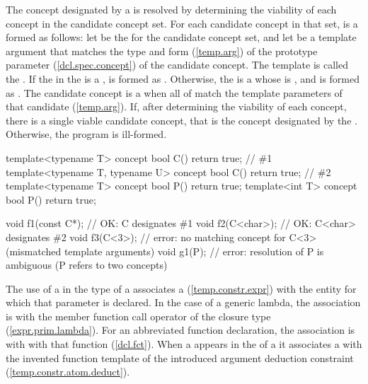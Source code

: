 \pnum
The concept designated by a 
is resolved by determining the viability of each concept in the
candidate concept set.
% 
For each candidate concept in that set,  is a 
 formed as follows:
% 
let  be the 
for the candidate concept set, and let  be a template 
argument that matches
the type and form (\ref{temp.arg}) of the prototype 
parameter (\ref{dcl.spec.concept})
of the candidate concept. 
% 
The template  is called the 
.
% 
If the  in
the  is
a ,  is
formed as .
% 
Otherwise, the  is
a  whose
 is
, and
 is formed as
.
% 
The candidate concept is a  when all
 of  
match the template parameters of that candidate 
(\ref{temp.arg}).
% 
If, after determining the viability of each concept, there is a
single viable candidate concept, that is the concept designated by the
.
% 
Otherwise, the program is ill-formed.
% 
\enterexample
\begin{codeblock}
template<typename T> concept bool C() { return true; }             // \#1
template<typename T, typename U> concept bool C() { return true; } // \#2
template<typename T> concept bool P() { return true; }
template<int T> concept bool P() { return true; }

void f1(const C*); // OK: C designates \#1
void f2(C<char>);  // OK: C<char> designates \#2
void f3(C<3>);     // error: no matching concept for C<3> (mismatched template arguments)
void g1(P);        // error: resolution of P is ambiguous (P refers to two concepts)
\end{codeblock}
\exitexample


\pnum
The use of a 
in the type of a 
associates a  
(\ref{temp.constr.expr}) with the 
entity for which that parameter is declared. 
% 
In the case of a generic lambda, the association is with
the member function call operator of the closure type 
(\ref{expr.prim.lambda}).
% 
For an abbreviated function declaration, the association is with
with that function (\ref{dcl.fct}).
% 
When a 
appears in the 
 of a 
 it
associates a  
with the invented function template of the introduced argument 
deduction constraint (\ref{temp.constr.atom.deduct}).

